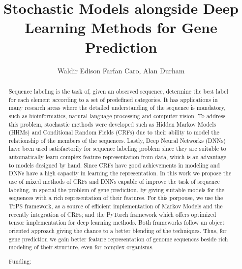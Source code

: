 \documentclass[twoside]{article}
\title{\vspace{-15mm}\fontsize{24pt}{10pt}\selectfont\textbf{ Stochastic Models alongside Deep Learning Methods for Gene Prediction }} %
\author{ Waldir Edison Farfan Caro, Alan Durham }
\affil{ Universidade de S\~ao Paulo }
\date{}
\begin{document}
  
  
  \maketitle %
  
  
  \thispagestyle{fancy} %
  
  
  \begin{abstract}
  Sequence labeling is the task of,  given an observed sequence,  determine the best label for each element according to a set of predefined categories. It has applications in many research areas where the detailed understanding of the sequence is mandatory,  such as bioinformatics,  natural language processing and computer vision. To address this problem,  stochastic methods were developed such as Hidden Markov Models (HHMs) and Conditional Random Fields (CRFs) due to their ability to model the relationship of the members of the sequences. Lastly,  Deep Neural Networks (DNNs) have been used satisfactorily for sequence labeling problem since they are suitable to automatically learn complex feature representation from data,  which is an advantage to models designed by hand. Since CRFs have good achievements in modeling and DNNs have a high capacity in learning the representation. In this work we propose the use of mixed methods of CRFs and DNNs capable of improve the task of sequence labeling,  in special the problem of gene prediction,  by giving suitable models for the sequences with a rich representation of their features. For this porpouse,  we use the ToPS framework,  as a source of efficient implementation of Markov Models and the recently integration of CRFs; and the PyTorch framework which offers optimized tensor implementation for deep learning methods. Both frameworks follow an object oriented approach giving the chance to a better blending of the techniques. Thus,  for gene prediction we gain better feature representation of genome sequences beside rich modeling of their structure,  even for complex organisms.
  
  Funding:  \\ 
  \end{abstract}
  
\end{document}
